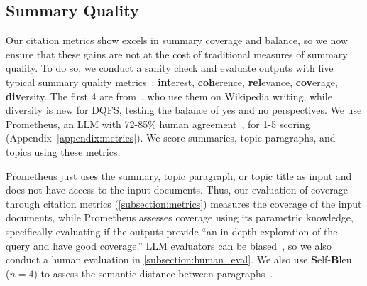 
\subsection{Summary Quality} \label{subsection:summary_comp}

Our citation metrics show \model excels in summary coverage and balance, so we now ensure that these gains are not at the cost of traditional measures of summary quality.
To do so, we conduct a sanity check and evaluate outputs
with five typical summary quality metrics~\cite{lloret2018challenging}: \textbf{int}erest, \textbf{coh}erence, \textbf{rel}evance, \textbf{cov}erage, \textbf{div}ersity.
The first 4 are from~\citet{shao2024assisting}, who use them on Wikipedia writing, while diversity is new for DQFS, testing the balance of yes and no perspectives.
We use Prometheus, an LLM with 72-85\% human agreement~\cite{kim2024prometheus}, for 1-5 scoring (Appendix~\ref{appendix:metrics}).
We score summaries, topic paragraphs, and topics using these metrics.

Prometheus just uses the summary, topic paragraph, or topic title as input and does not have access to the input documents.
Thus, our evaluation of coverage through citation metrics (\cref{subsection:metrics}) measures the coverage of the input documents, while Prometheus assesses coverage using its parametric knowledge, specifically evaluating if the outputs provide ``an in-depth exploration of the query and have good coverage.''
LLM evaluators can be biased~\cite{wang-etal-2024-large-language-models-fair}, so we also conduct a human evaluation in \cref{subsection:human_eval}.
We also use \textbf{S}elf-\textbf{B}leu~\cite{zhu2018texygen} ($n=4$) to assess the semantic distance between paragraphs~\cite{liu-etal-2023-dimongen}. 

